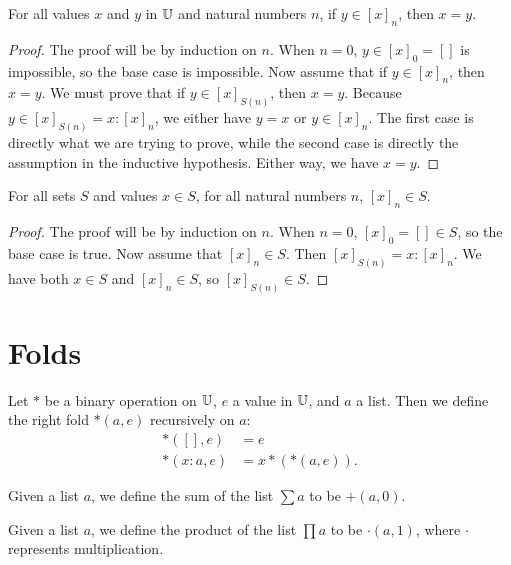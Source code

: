 \documentclass[../../math.tex]{subfiles}
\begin{document}
\begin{theorem} \label{in_list_constant}
    For all values $x$ and $y$ in $\mathbb{U}$ and natural numbers $n$, if $y \in
    [x]_n$, then $x = y$.
\end{theorem}
\begin{proof}
    The proof will be by induction on $n$.  When $n = 0$, $y \in [x]_0 = []$ is
    impossible, so the base case is impossible.  Now assume that if $y \in
    [x]_n$, then $x = y$.  We must prove that if $y \in [x]_{S(n)}$, then $x =
    y$.  Because $y \in [x]_{S(n)} = x : [x]_n$, we either have $y = x$ or $y
    \in [x]_n$.  The first case is directly what we are trying to prove, while
    the second case is directly the assumption in the inductive hypothesis.
    Either way, we have $x = y$.
\end{proof}

\begin{theorem} \label{list_prop_constant}
    For all sets $S$ and values $x \in S$, for all natural numbers $n$, $[x]_n
    \in S$.
\end{theorem}
\begin{proof}
    The proof will be by induction on $n$.  When $n = 0$, $[x]_0 = [] \in S$, so
    the base case is true.  Now assume that $[x]_n \in S$.  Then $[x]_{S(n)} = x
    : [x]_n$.  We have both $x \in S$ and $[x]_n \in S$, so $[x]_{S(n)} \in S$.
\end{proof}

\section{Folds}

\begin{definition}
    Let $*$ be a binary operation on $\mathbb{U}$, $e$ a value in $\mathbb{U}$, and $a$ a list.
    Then we define the right fold $*(a, e)$ recursively on $a$:
    \begin{align*}
           *([], e) &= e \\
        *(x : a, e) &= x * (*(a, e)).
    \end{align*}
\end{definition}

\begin{definition}
    Given a list $a$, we define the sum of the list $\sum a$ to be $+(a, 0)$.
\end{definition}

\begin{definition}
    Given a list $a$, we define the product of the list $\prod a$ to be
    $\cdot(a, 1)$, where $\cdot$ represents multiplication.
\end{definition}
\end{document}
